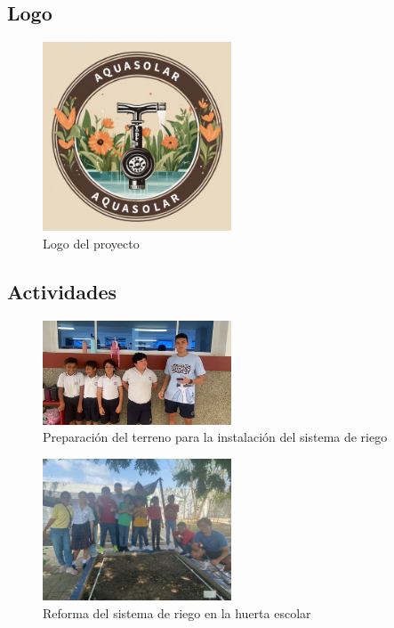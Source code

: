 \documentclass[12pt]{article}
\begin{document}
\subsection*{Logo}
\begin{figure}[h!]
      \centering
      \includegraphics[width=0.5\textwidth]{imagenes/logo.png}
      \caption{Logo del proyecto}
      \label{fig:logo}
\end{figure}

\subsection*{Actividades}
\begin{figure}[h!]
      \centering
      \includegraphics[width=0.5\textwidth]{imagenes/actividad1.jpg}
      \caption{Preparación del terreno para la instalación del sistema de riego}
      \label{fig:actividad1}
\end{figure}

\begin{figure}[h!]
      \centering
      \includegraphics[width=0.5\textwidth]{imagenes/actividad2.jpg}
      \caption{Reforma del sistema de riego en la huerta escolar}
      \label{fig:actividad2}
\end{figure}
\end{document}
